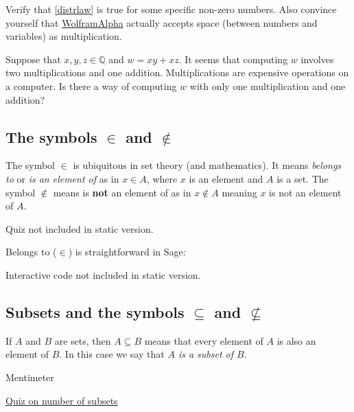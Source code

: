 \begin{exercise}
  Verify that \eqref{distrlaw} is true for some specific non-zero numbers. Also
  convince yourself that \href{https://wolframalpha.com}{WolframAlpha} actually
  accepts space (between numbers and variables) as multiplication.
\end{exercise}

\begin{exercise}
  Suppose that $x, y, z\in \mathbb{Q}$ and $w = x y + x z$. It seems
  that computing $w$ involves two multiplications and one addition. Multiplications are
  expensive operations on a computer. Is there a way of computing
  $w$ with only one multiplication and one addition?
\end{exercise}

\subsection{The symbols $\in$ and $\notin$}

The symbol $\in$ is ubiquitous in set theory (and mathematics).
It means \emph{belongs to} or \emph{is an element of} as in
$x\in A$, where $x$ is an element and $A$ is a set. The symbol
$\notin$ means is \textbf{not} an element of as in
$x\notin A$ meaning $x$ is not an element of $A$.

\begin{quizexercise} Quiz not included in static version.\end{quizexercise}

Belongs to ($\in$) is straightforward in Sage:

\begin{sage} Interactive code not included in static version.\end{sage}









\subsection{Subsets and the symbols $\subseteq$ and $\not\subseteq$}

If $A$ and $B$ are sets, then $A\subseteq B$ means that
every element of $A$ is also an element of $B$. In this case we say
that \emph{$A$ is a subset of $B$}.


\begin{button}{Mentimeter}

  \href{https://www.mentimeter.com/s/c3a1008e91c1e2d253b85e55e36162bf/dfe4f6e70152}{Quiz on number of subsets}

\end{button}

